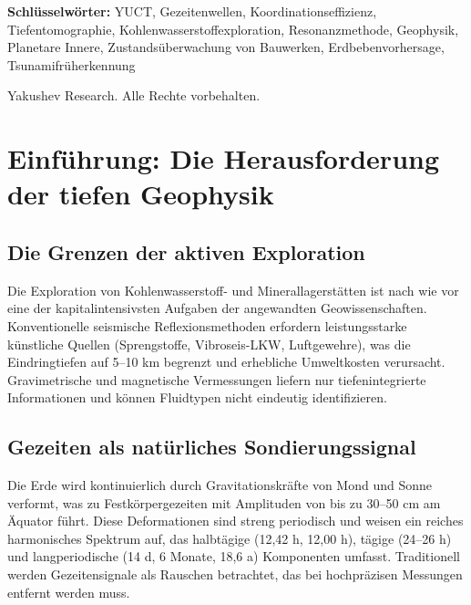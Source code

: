 \documentclass[12pt,a4paper]{article}
\theoremstyle{remark}
\begin{document}
\begin{titlepage}
\begin{center}
			\vspace{1cm}
			
			\noindent
			\small\textbf{Schlüsselwörter:} YUCT, Gezeitenwellen, Koordinationseffizienz, Tiefentomographie, Kohlenwasserstoffexploration, Resonanzmethode, Geophysik, Planetare Innere, Zustandsüberwachung von Bauwerken, Erdbebenvorhersage, Tsunamifrüherkennung
			
			\vspace{0.5cm}
			
			\noindent
			 Yakushev Research. Alle Rechte vorbehalten.
		\end{center}
	\end{titlepage}
	
	\tableofcontents
	\newpage
	
	\section{Einführung: Die Herausforderung der tiefen Geophysik}
	\label{sec:intro}
	
	\subsection{Die Grenzen der aktiven Exploration}
	
	Die Exploration von Kohlenwasserstoff- und Minerallagerstätten ist nach wie vor eine der kapitalintensivsten Aufgaben der angewandten Geowissenschaften. Konventionelle seismische Reflexionsmethoden erfordern leistungsstarke künstliche Quellen (Sprengstoffe, Vibroseis-LKW, Luftgewehre), was die Eindringtiefen auf 5–10 km begrenzt und erhebliche Umweltkosten verursacht. Gravimetrische und magnetische Vermessungen liefern nur tiefenintegrierte Informationen und können Fluidtypen nicht eindeutig identifizieren.
	
	\subsection{Gezeiten als natürliches Sondierungssignal}
	
	Die Erde wird kontinuierlich durch Gravitationskräfte von Mond und Sonne verformt, was zu Festkörpergezeiten mit Amplituden von bis zu 30–50 cm am Äquator führt. Diese Deformationen sind streng periodisch und weisen ein reiches harmonisches Spektrum auf, das halbtägige (12,42 h, 12,00 h), tägige (24–26 h) und langperiodische (14 d, 6 Monate, 18,6 a) Komponenten umfasst. Traditionell werden Gezeitensignale als Rauschen betrachtet, das bei hochpräzisen Messungen entfernt werden muss.
	
\end{document}
